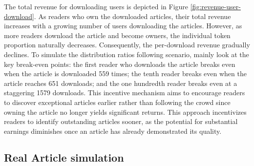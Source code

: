 \documentclass[lettersize,journal]{IEEEtran}
\begin{document}
The total revenue for downloading users is depicted in Figure \ref{fig:revenue-user-download}. As readers who own the downloaded articles, their total revenue increases with a growing number of users downloading the articles. However, as more readers download the article and become owners, the individual token proportion naturally decreases. Consequently, the per-download revenue gradually declines.
To simulate the distribution ratios following scenario, mainly look at the key break-even points\cite{norreklit2000balance}: the first reader who downloads the article breaks even when the article is downloaded 559 times; the tenth reader breaks even when the article reaches 651 downloads; and the one hundredth reader breaks even at a staggering 1579 downloads. This incentive mechanism aims to encourage readers to discover exceptional articles earlier rather than following the crowd since owning the article no longer yields significant returns.
This approach incentivizes readers to identify outstanding articles sooner, as the potential for substantial earnings diminishes once an article has already demonstrated its quality.


\subsection{Real Article simulation}
\end{document}
